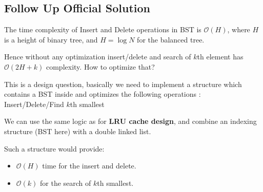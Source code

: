 \subsection{Follow Up Official Solution}
The time complexity of Insert and Delete operations in BST is $\mathcal{O}(H)$, where $H$ is a height of binary tree, and $H = \log N$ for the balanced tree.

Hence without any optimization insert/delete and search of $k$th element has $\mathcal{O}(2H + k)$ complexity. How to optimize that?

This is a design question, basically we need to implement a structure which contains a BST inside and optimizes the following operations : Insert/Delete/Find $k$th smallest

We can use the same logic as for \textbf{LRU cache design}, and combine an indexing structure (BST here) with a double linked list.

Such a structure would provide:

\begin{itemize}
\item $\mathcal{O}(H)$ time for the insert and delete.

\item $\mathcal{O}(k)$ for the search of $k$th smallest.
\end{itemize}